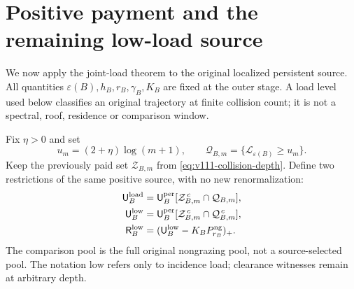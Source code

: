 \section{Positive payment and the remaining low-load source}
\label{sec:v112-source}
We now apply the joint-load theorem to the original localized
persistent source. All quantities $\varepsilon(B),h_B,r_B,\gamma_B,K_B$
are fixed at the outer stage. A load level used below classifies an
original trajectory at finite collision count; it is not a spectral,
roof, residence or comparison window.

Fix $\eta>0$ and set
\begin{equation}\label{eq:v112-paid-set}
 u_m=(2+\eta)\log(m+1),\qquad
 \mathcal Q_{B,m}=\{\mathscr L_{\varepsilon(B)}\ge u_m\}.
\end{equation}
Keep the previously paid set $\mathcal Z_{B,m}$ from
\eqref{eq:v111-collision-depth}. Define two restrictions of the
same positive source, with no new renormalization:
\begin{equation}\label{eq:v112-new-sources}
 \begin{split}
 \mathsf U_B^{\rm load}
  &=\mathsf U_B^{\rm per}[\mathcal Z_{B,m}^{\,c}\cap\mathcal Q_{B,m}],\\
 \mathsf U_B^{\rm low}
  &=\mathsf U_B^{\rm per}[\mathcal Z_{B,m}^{\,c}\cap\mathcal Q_{B,m}^{\,c}],\\
 \mathsf R_B^{\rm low}
  &=(\mathsf U_B^{\rm low}-K_BP_{r_B}^{\rm ng})_+.
 \end{split}
\end{equation}
The comparison pool is the full original nongrazing pool, not a
source-selected pool. The notation $\mathrm{low}$ refers only to
incidence load; clearance witnesses remain at arbitrary depth.

